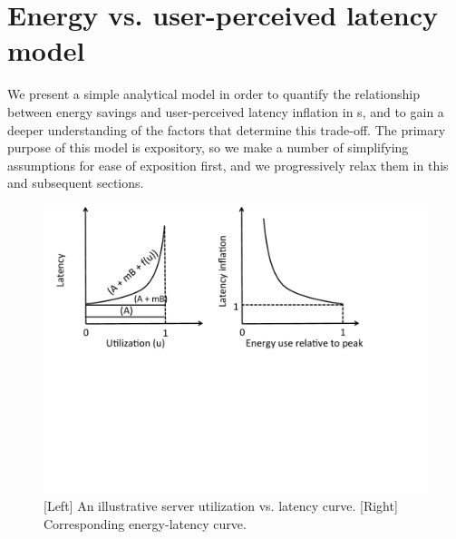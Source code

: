 \section{Energy vs. user-perceived latency model}
\label{sec:analysis}

We present a simple analytical model in order to quantify the relationship between energy savings and user-perceived latency inflation in \cdc s, and to gain a deeper understanding of the factors that determine this trade-off. The primary purpose of this model is expository, so we make a number of simplifying assumptions for ease of exposition first, and we progressively relax them in this and subsequent sections.



\begin{figure}
\centering
\includegraphics[scale=0.36]{figures/model.pdf}
\vspace{-1.5in}
\caption{[Left] An illustrative server utilization vs. latency curve. [Right] Corresponding energy-latency curve.}
\label{fig:model}
\end{figure}

